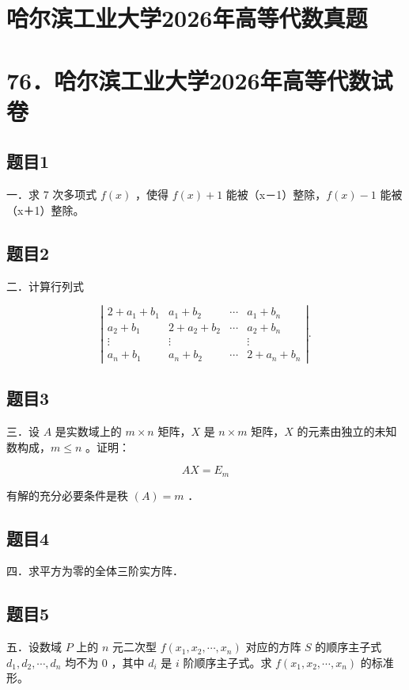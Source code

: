 \documentclass{article}
\begin{document}
\section*{哈尔滨工业大学2026年高等代数真题}
\section*{76．哈尔滨工业大学2026年高等代数试卷}

\subsection{题目1}
一．求 7 次多项式 \(f(x)\) ，使得 \(f(x)+1\) 能被（x－1）整除，\(f(x)-1\) 能被（x＋1）整除。

\subsection{题目2}
二．计算行列式

\[
\left|\begin{array}{cccc}
2+a_{1}+b_{1} & a_{1}+b_{2} & \cdots & a_{1}+b_{n} \\
a_{2}+b_{1} & 2+a_{2}+b_{2} & \cdots & a_{2}+b_{n} \\
\vdots & \vdots & & \vdots \\
a_{n}+b_{1} & a_{n}+b_{2} & \cdots & 2+a_{n}+b_{n}
\end{array}\right| .
\]

\subsection{题目3}
三．设 \(A\) 是实数域上的 \(m \times n\) 矩阵，\(X\) 是 \(n \times m\) 矩阵，\(X\) 的元素由独立的未知数构成，\(m \leq n\) 。证明：

\[
A X=E_{m}
\]

有解的充分必要条件是秩 \((A)=m\) ．

\subsection{题目4}
四．求平方为零的全体三阶实方阵．

\subsection{题目5}
五．设数域 \(P\) 上的 \(n\) 元二次型 \(f\left(x_{1}, x_{2}, \cdots, x_{n}\right)\) 对应的方阵 \(S\) 的顺序主子式 \(d_{1}, d_{2}, \cdots, d_{n}\) 均不为 0 ，其中 \(d_{i}\) 是 \(i\) 阶顺序主子式。求 \(f\left(x_{1}, x_{2}, \cdots, x_{n}\right)\) 的标准形。
\end{document}
